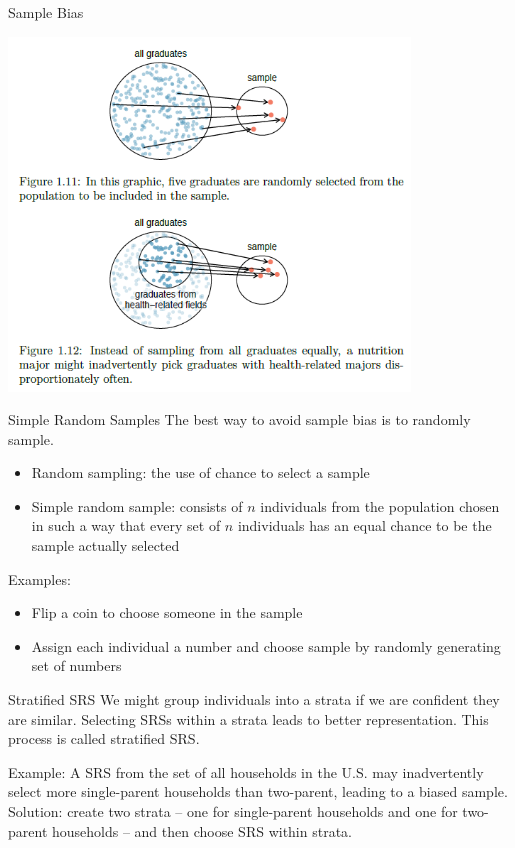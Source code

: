 \documentclass{beamer}
\begin{document}
\begin{frame}{Sample Bias}
	\begin{center}
		\includegraphics[width=0.8\textwidth]{sample}
	\end{center}
\end{frame} 

\begin{frame}{Simple Random Samples}
	The best way to avoid sample bias is to randomly sample.
	\begin{itemize}
		\item \alert{Random sampling}: the use of chance to select a sample
		\item \alert{Simple random sample}: consists of $n$ individuals from the population chosen in such a way that every set of $n$ individuals has an equal chance to be the sample actually selected 
	\end{itemize}
	Examples:
	\begin{itemize}
		\item Flip a coin to choose someone in the sample
		\item Assign each individual a number and choose sample by randomly generating set of numbers 
	\end{itemize}
\end{frame}

\begin{frame}{Stratified SRS}
	We might group individuals into a \alert{strata} if we are confident they are similar. Selecting SRSs within a strata leads to better representation. This process is called \alert{stratified SRS}.
	
	Example: A SRS from the set of all households in the U.S. may inadvertently select more single-parent households than two-parent, leading to a biased sample. 
	 Solution: create two strata -- one for single-parent households and one for two-parent households -- and then choose SRS within strata.
\end{frame}
\end{document}
